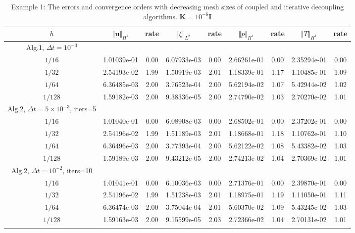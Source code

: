 \documentclass{article}
\numberwithin{equation}{section}
\begin{document}
 \begin{table}[htbp]\tiny 
\caption{Example 1: The errors and convergence orders with decreasing mesh sizes of
 coupled and iterative decoupling algorithms. $ \bm K=10^{-6}\bm{I}$ }
\centering
\begin{tabular}{ccccccccc}
\toprule
  $h$&$\Vert\bm u\Vert_{H^1}$ &rate &$\Vert\xi\Vert_{L^2}$ &rate &$\Vert p\Vert_{H^1}$ &rate&$\Vert T\Vert_{H^1}$ &rate \\ 
\midrule
Alg.1, $\Delta t=10^{-3}$\\
\midrule
$1/16$ & 1.01039e-01 & 0.00 & 6.07933e-03 & 0.00 & 2.66261e-01 & 0.00 & 2.35294e-01 & 0.00 \\
$1/32$ & 2.54193e-02 & 1.99 & 1.50919e-03 & 2.01 & 1.18339e-01 & 1.17 & 1.10485e-01 & 1.09 \\
$1/64$ & 6.36485e-03 & 2.00 & 3.76523e-04 & 2.00 & 5.62194e-02 & 1.07 & 5.42944e-02 & 1.02 \\
$1/128$ & 1.59182e-03 & 2.00 & 9.38336e-05 & 2.00 & 2.74790e-02 & 1.03 & 2.70270e-02 & 1.01 \\
\midrule
Alg.2, $\Delta t=5\times 10^{-3}$, iters=5 &\\
\midrule
$1/16$ & 1.01040e-01 & 0.00 & 6.08908e-03 & 0.00 & 2.68502e-01 & 0.00 & 2.37202e-01 & 0.00 \\
$1/32$ & 2.54196e-02 & 1.99 & 1.51189e-03 & 2.01 & 1.18668e-01 & 1.18 & 1.10762e-01 & 1.10 \\
$1/64$ & 6.36496e-03 & 2.00 & 3.77393e-04 & 2.00 & 5.62122e-02 & 1.08 & 5.43382e-02 & 1.03 \\
$1/128$ & 1.59189e-03 & 2.00 & 9.43212e-05 & 2.00 & 2.74213e-02 & 1.04 & 2.70369e-02 & 1.01 \\
\midrule
Alg.2, $\Delta t=10^{-2}$, iters=10 &\\
\midrule
$1/16$ & 1.01041e-01 & 0.00 & 6.10036e-03 & 0.00 & 2.71376e-01 & 0.00 & 2.39870e-01 & 0.00 \\
$1/32$ & 2.54196e-02 & 1.99 & 1.51238e-03 & 2.01 & 1.18975e-01 & 1.19 & 1.11050e-01 & 1.11 \\
$1/64$ & 6.36474e-03 & 2.00 & 3.75044e-04 & 2.01 & 5.60370e-02 & 1.09 & 5.43245e-02 & 1.03 \\
$1/128$ & 1.59163e-03 & 2.00 & 9.15599e-05 & 2.03 & 2.72366e-02 & 1.04 & 2.70131e-02 & 1.01 \\
\bottomrule
\label{tab: K 1e-6} 
\end{tabular}
\end{table} 
\end{document}
